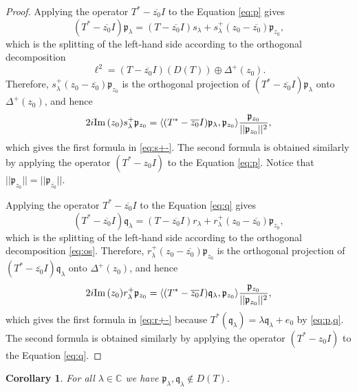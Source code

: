 \documentclass [12pt]{article}
\def\Im{{\rm Im}\,}
\newtheorem{cor}[thm]{Corollary}
\newcommand{\C}{\mathbb{C}}
\newcommand{\la}{\lambda}
\begin{document}
\begin{proof} Applying the operator $T^*-\overline{z_0}I$ to the Equation \eqref{eq:p} gives
$$
(T^*-\overline{z_0}I)\mathfrak{p}_{\la}=(T-\overline{z_0}I)s_\la +s_\la^+(z_0-\overline{z_0})\mathfrak{p}_{z_0},
$$
which is the splitting of the left-hand side   according to the orthogonal decomposition
\begin{equation}\label{eq:os}
\ell^2=(T-\overline{z_0}I)(D(T)) \oplus \Delta^+(z_0).
\end{equation}
Therefore, $s_\la^+(z_0-\overline{z_0})\mathfrak{p}_{z_0}$ is the orthogonal projection of 
$(T^*-\overline{z_0}I)\mathfrak{p}_{\la}$ onto  $\Delta^+(z_0)$, and hence
$$
2i\Im(z_0)s_\la^+\mathfrak{p}_{z_0}=\langle(T^*-\overline{z_0}I)\mathfrak{p}_{\la},\mathfrak{p}_{z_0}\rangle
\frac{\mathfrak{p}_{z_0}}{||\mathfrak{p}_{z_0}||^2},
$$
which gives the first formula in \eqref{eq:s+-}. The second formula is obtained similarly by applying the operator $(T^*-z_0I)$ to the Equation \eqref{eq:p}. Notice that $||\mathfrak{p}_{z_0}||=||\mathfrak{p}_{\overline{z_0}}||$.

Applying the operator $T^*-\overline{z_0}I$ to the Equation \eqref{eq:q} gives
$$
(T^*-\overline{z_0}I)\mathfrak{q}_{\la}=(T-\overline{z_0}I)r_\la +r_\la^+(z_0-\overline{z_0})\mathfrak{p}_{z_0},
$$
which is the splitting of the left-hand side   according to the orthogonal decomposition
\eqref{eq:os}.
Therefore, $r_\la^+(z_0-\overline{z_0})\mathfrak{p}_{z_0}$ is the orthogonal projection of 
$(T^*-\overline{z_0}I)\mathfrak{q}_{\la}$ onto  $\Delta^+(z_0)$, and hence
$$
2i\Im(z_0)r_\la^+\mathfrak{p}_{z_0}=\langle(T^*-\overline{z_0}I)\mathfrak{q}_{\la},\mathfrak{p}_{z_0}\rangle
\frac{\mathfrak{p}_{z_0}}{||\mathfrak{p}_{z_0}||^2},
$$
which gives the first formula in \eqref{eq:r+-} because $T^*(\mathfrak{q}_{\la})=\la\mathfrak{q}_{\la}+e_0$ by \eqref{eq:p,q}. The second formula is obtained similarly by applying the operator $(T^*-z_0I)$ to the Equation \eqref{eq:q}.
\end{proof}

\begin{cor}\label{thm:pqnotinDA} For all  $\la\in\C$  we have $\mathfrak{p}_{\la},\mathfrak{q}_{\la}\notin D(T)$. 
\end{cor}
\end{document}
